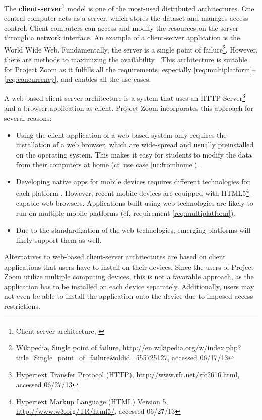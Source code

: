 The \textbf{client-server}\footnote{Client-server architecture, \cite{Berson_1996}} model is one of the most-used distributed architectures. One central computer acts as a server, which stores the dataset and manages access control. Client computers can access and modify the resources on the server through a network interface. An example of a client-server application is the World Wide Web. Fundamentally, the server is a single point of failure\footnote{Wikipedia, Single point of failure, \url{http://en.wikipedia.org/w/index.php?title=Single_point_of_failure&oldid=555725127}, accessed 06/17/13}. However, there are methods to maximizing the availability \cite{Gray_1991} \cite{Colyer_2000}. This architecture is suitable for Project Zoom as it fulfills all the requirements, especially \ref{req:multiplatform}–\ref{req:concurrency}, and enables all the use cases.

A web-based client-server architecture is a system that uses an HTTP-Server\footnote{Hypertext Transfer Protocol (HTTP), \url{http://www.rfc.net/rfc2616.html}, accessed 06/27/13} and a brow\-ser application as client. Project Zoom incorporates this approach for several reasons:
\begin{itemize}
\item Using the client application of a web-based system only requires the installation of a web browser, which are wide-spread and usually preinstalled on the operating system. This makes it easy for students to modify the data from their computers at home (cf. use case \ref{uc:fromhome}).
\item Developing native apps for mobile devices requires different technologies for each platform \cite{Charland_2011}. However, recent mobile devices are equipped with HTML5\footnote{Hypertext Markup Language (HTML) Version 5, \url{http://www.w3.org/TR/html5/}, accessed 06/27/13}-capable web browsers. Applications built using web technologies are likely to run on multiple mobile platforms (cf. requirement \ref{req:multiplatform}).
\item Due to the standardization of the web technologies, emerging platforms will likely support them as well.
\end{itemize}

Alternatives to web-based client-server architectures are based on client applications that users have to install on their devices. Since the users of Project Zoom utilize multiple computing devices, this is not a favorable approach, as the application has to be installed on each device separately. Additionally, users may not even be able to install the application onto the device due to imposed access restrictions.

